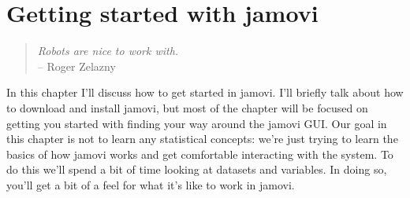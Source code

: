 

\chapter{Getting started with jamovi\label{ch:introj}}

\begin{quote}
{\it Robots are nice to work with.} \\ 
\hspace*{2cm} -- Roger Zelazny
\end{quote}

\noindent
In this chapter I'll discuss how to get started in jamovi. I'll briefly talk about how to download and install jamovi, but most of the chapter will be focused on getting you started with finding your way around the jamovi GUI. Our goal in this chapter is not to learn any statistical concepts: we're just trying to learn the basics of how jamovi works and get comfortable interacting with the system. To do this we'll spend a bit of time looking at datasets and variables. In doing so, you'll get a bit of a feel for what it's like to work in jamovi. 

